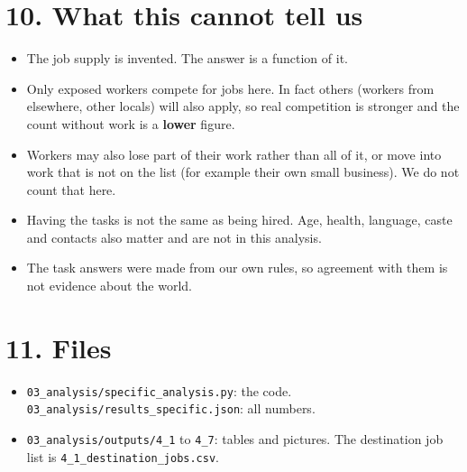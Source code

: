 \documentclass[11pt]{article}
\begin{document}
\section*{10. What this cannot tell us}
\begin{itemize}[leftmargin=1.2em,itemsep=2pt]
\item The job supply is invented. The answer is a function of it.
\item Only exposed workers compete for jobs here. In fact others (workers from elsewhere, other locals) will also apply, so real competition is stronger and the count without work is a \textbf{lower} figure.
\item Workers may also lose part of their work rather than all of it, or move into work that is not on the list (for example their own small business). We do not count that here.
\item Having the tasks is not the same as being hired. Age, health, language, caste and contacts also matter and are not in this analysis.
\item The task answers were made from our own rules, so agreement with them is not evidence about the world.
\end{itemize}

\section*{11. Files}
\begin{itemize}[leftmargin=1.2em,itemsep=1pt]
\item \texttt{03\_analysis/specific\_analysis.py}: the code. \texttt{03\_analysis/results\_specific.json}: all numbers.
\item \texttt{03\_analysis/outputs/4\_1} to \texttt{4\_7}: tables and pictures. The destination job list is \texttt{4\_1\_destination\_jobs.csv}.
\end{itemize}
\end{document}
